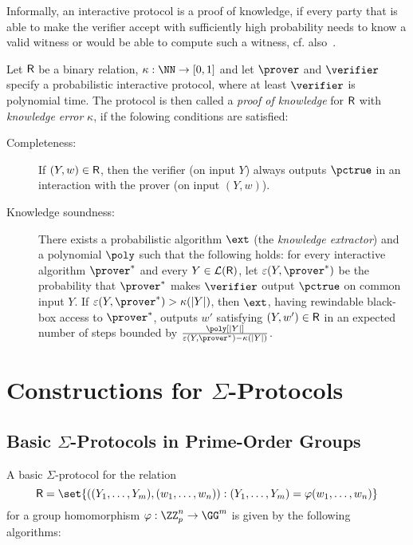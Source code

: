 \documentclass[runningheads]{llncs}
\begin{document}
Informally, an interactive protocol is a proof of knowledge, if every party that is able to make the verifier accept with sufficiently high probability needs to know a valid witness or would be able to compute such a witness, cf. also~\cite[1.6.3]{zkproof-reference}.
\begin{definition}\label{def:pok}
  Let $\mathsf{R}$ be a binary relation, $\kappa:\NN\to[0,1]$ and let $\prover$ and $\verifier$ specify a probabilistic interactive protocol, where at least $\verifier$ is polynomial time.
  The protocol is then called a \emph{proof of knowledge} for $\mathsf{R}$ with \emph{knowledge error} $\kappa$, if the folowing conditions are satisfied:
  \begin{description}
    \item[Completeness:]
      If $(Y,w)\in\mathsf{R}$, then the verifier (on input $Y$) always outputs $\accept$ in an interaction with the prover (on input $(Y,w)$).
    \item[Knowledge soundness:]
      There exists a probabilistic algorithm $\ext$ (the \emph{knowledge extractor}) and a polynomial $\poly$ such that the following holds:
      for every interactive algorithm $\prover^*$ and every $Y\in\mathcal{L}(\mathsf{R})$, let $\varepsilon(Y,\prover^*)$ be the probability that $\prover^*$ makes $\verifier$ output $\accept$ on common input $Y$.
      If $\varepsilon(Y,\prover^*)>\kappa(|Y|)$, then $\ext$, having rewindable black-box access to $\prover^*$, outputs $w'$ satisfying $(Y,w')\in\mathsf{R}$ in an expected number of steps bounded by $\frac{\poly[|Y|]}{\varepsilon(Y,\prover^*)-\kappa(|Y|)}$.
  \end{description}
\end{definition}

\section{Constructions for $\Sigma$-Protocols}
\subsection{Basic $\Sigma$-Protocols in Prime-Order Groups}\label{sec:basicsigma}
A basic $\Sigma$-protocol for the relation
\[
  \relation=\set{((Y_1,\dots,Y_m),(w_1,\dots,w_n)) : (Y_1,\dots,Y_m)=\varphi(w_1,\dots,w_n)}
\]
 for a group homomorphism $\varphi:\ZZ_p^n\to\GG^m$ is given by the following algorithms:
\end{document}
